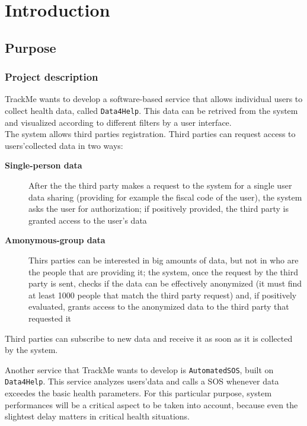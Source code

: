 \section{Introduction}
\label{sec:intro}

  \subsection{Purpose}

      \subsubsection{Project description}

        TrackMe wants to develop a software-based service that allows individual users to collect health data, called \texttt{Data4Help}. This data can be retrived from the system and visualized according to different filters by a user interface. \\
        The system allows third parties registration. Third parties can request access to users'collected data in two ways:

        \begin{description}
          \item [\textbf{Single-person data}] After the the third party makes a request to the system for a single user data sharing (providing for example the fiscal code of the user), the system asks the user for authorization; if positively provided, the third party is granted access to the user's data
          \item [\textbf{Amonymous-group data}] Thirs parties can be interested in big amounts of data, but not in who are the people that are providing it; the system, once the request by the third party is sent, checks if the data can be effectively anonymized (it must find at least 1000 people that match the third party request) and, if positively evaluated, grants access to the anonymized data to the third party that requested it
        \end{description}

        Third parties can subscribe to new data and receive it as soon as it is collected by the system.

        Another service that TrackMe wants to develop is \texttt{AutomatedSOS}, built on \texttt{Data4Help}. This service analyzes users'data and calls a SOS whenever data exceedes the basic health parameters. For this particular purpose, system performances will be a critical aspect to be taken into account, because even the slightest delay matters in critical health situations.

